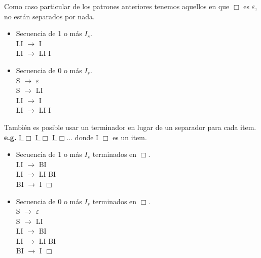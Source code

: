 \documentclass[\main/ApuntesPL.tex]{subfiles}
\begin{document}
      \par
      Como caso particular de los patrones anteriores tenemos aquellos en que $\Box$ es
      $\varepsilon$, no están separados por nada.
      \begin{itemize}
        \item Secuencia de 1 o más $I_s$.\\
            \hspace{3mm}LI $\rightarrow$ I\\
            \hspace{3mm}LI $\rightarrow$ LI I
        \item Secuencia de 0 o más $I_s$.\\
            \hspace{3mm}S $\rightarrow$ $\varepsilon$\\
            \hspace{3mm}S $\rightarrow$ LI\\
            \hspace{3mm}LI $\rightarrow$ I\\
            \hspace{3mm}LI $\rightarrow$ LI I
      \end{itemize}

      \par
      También es posible usar un terminador en lugar de un separador para cada item.\\
      \hspace{3mm}\textbf{e.g.} \underline{I $\Box$} \underline{I $\Box$} \underline{I $\Box$}...
        donde I $\Box$ es un item.\\
      \begin{itemize}
        \item Secuencia de 1 o más $I_s$ terminados en $\Box$.\\
            \hspace{3mm}LI $\rightarrow$ BI\\
            \hspace{3mm}LI $\rightarrow$ LI BI\\
            \hspace{3mm}BI $\rightarrow$ I $\Box$\\
        \item Secuencia de 0 o más $I_s$ terminados en $\Box$.\\
            \hspace{3mm}S $\rightarrow$ $\varepsilon$\\
            \hspace{3mm}S $\rightarrow$ LI\\
            \hspace{3mm}LI $\rightarrow$ BI\\
            \hspace{3mm}LI $\rightarrow$ LI BI\\
            \hspace{3mm}BI $\rightarrow$ I $\Box$\\
      \end{itemize}
\end{document}
